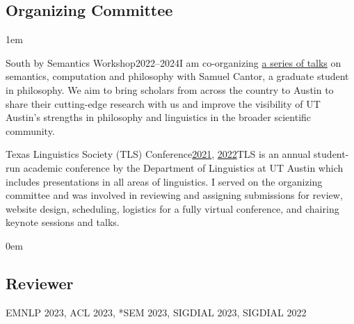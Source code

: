 \subsection{Organizing Committee}

\leftskip1em\relax

\smallentry
  {\large South by Semantics Workshop}{2022--2024}{I am co-organizing \href{https://sites.google.com/utexas.edu/sxsw/}{a series of talks} on semantics, computation and philosophy with Samuel Cantor, a graduate student in philosophy. We aim  to bring scholars from across the country to Austin to share their cutting-edge research with us and improve the visibility of UT Austin’s strengths in philosophy and linguistics in the broader scientific community.}
  
\smallentry
    {\large Texas Linguistics Society (TLS) Conference}{\href{http://tls.ling.utexas.edu/2021/}{2021}, \href{http://tls.ling.utexas.edu/2022/}{2022}}{TLS is an annual student-run academic conference by the Department of Linguistics at UT Austin which includes presentations in all areas of linguistics. I served on the organizing committee and was involved in reviewing and assigning submissions for review, website design, scheduling, logistics for a fully virtual conference, and chairing keynote sessions and talks.}

\leftskip0em\relax

\subsection{Reviewer}

\quad EMNLP 2023, ACL 2023, *SEM 2023, SIGDIAL 2023, SIGDIAL 2022
